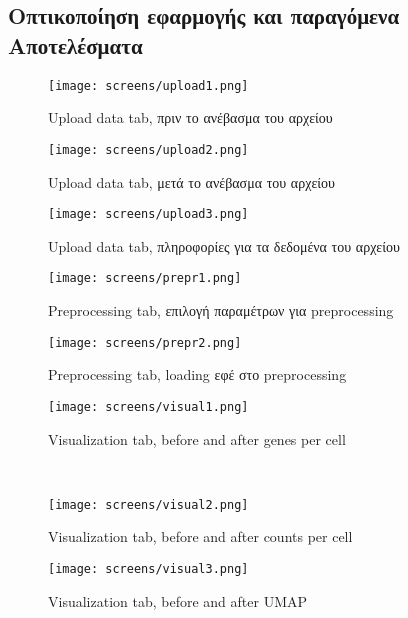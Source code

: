 \documentclass{article}  %
\begin{document}
\subsection{Οπτικοποίηση εφαρμογής και παραγόμενα Αποτελέσματα}
\label{sec:visualization}

\begin{figure}[H]
    \centering
    \texttt{[image: screens/upload1.png]}
    \caption{Upload data tab, πριν το ανέβασμα του αρχείου}
    \label{fig:upload1}
\end{figure}

\begin{figure}[H]
    \centering
    \texttt{[image: screens/upload2.png]}
    \caption{Upload data tab, μετά το ανέβασμα του αρχείου}
    \label{fig:upload2}
\end{figure}

\begin{figure}[H]
    \centering
    \texttt{[image: screens/upload3.png]}
    \caption{Upload data tab, πληροφορίες για τα δεδομένα του αρχείου}
    \label{fig:upload3}
\end{figure}

\begin{figure}[H]
    \centering
    \texttt{[image: screens/prepr1.png]}
    \caption{Preprocessing tab, επιλογή παραμέτρων για preprocessing}
\end{figure}

\begin{figure}[H]
    \centering
    \texttt{[image: screens/prepr2.png]}
    \caption{Preprocessing tab, loading εφέ στο preprocessing}
    \label{fig:prepr2}
\end{figure}

\begin{figure}[H]
    \centering
    \texttt{[image: screens/visual1.png]}
        \caption{Visualization tab, before and after genes per cell}
    \label{fig:visual1}
\end{figure}
\
\begin{figure}[H]
    \centering
    \texttt{[image: screens/visual2.png]}
    \caption{Visualization tab, before and after counts per cell}
    \label{fig:visual2}
\end{figure}

\begin{figure}[H]
    \centering
    \texttt{[image: screens/visual3.png]}
    \caption{Visualization tab, before and after UMAP}
    \label{fig:visual3}
\end{figure}
\end{document}
